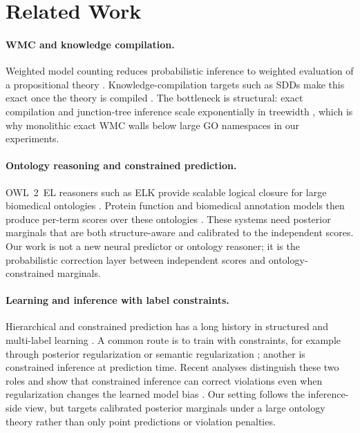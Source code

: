 \documentclass[letterpaper]{article}
\begin{document}
\section{Related Work}\label{sec:related}
\paragraph{WMC and knowledge compilation.}
Weighted model counting reduces probabilistic inference to weighted evaluation of a propositional theory \citep{chavira2008wmc}. Knowledge-compilation targets such as SDDs make this exact once the theory is compiled \citep{darwiche2002kcmap,darwiche2011sdd}. The bottleneck is structural: exact compilation and junction-tree inference scale exponentially in treewidth \citep{bodlaender1993treewidth}, which is why monolithic exact WMC walls below large GO namespaces in our experiments.

\paragraph{Ontology reasoning and constrained prediction.}
OWL~2~EL reasoners such as ELK provide scalable logical closure for large biomedical ontologies \citep{baader2005elenvelope,kazakov2014elk}. Protein function and biomedical annotation models then produce per-term scores over these ontologies \citep{kulmanov2018deepgo,kulmanov2020deepgoplus,kulmanov2022deepgozero,yu2023clean}. These systems need posterior marginals that are both structure-aware and calibrated to the independent scores. Our work is not a new neural predictor or ontology reasoner; it is the probabilistic correction layer between independent scores and ontology-constrained marginals.

\paragraph{Learning and inference with label constraints.}
Hierarchical and constrained prediction has a long history in structured and multi-label learning \citep{silla2011survey}. A common route is to train with constraints, for example through posterior regularization or semantic regularization \citep{ganchev2010posterior,diligenti2017semantic}; another is constrained inference at prediction time. Recent analyses distinguish these two roles and show that constrained inference can correct violations even when regularization changes the learned model bias \citep{wang2023regularization}. Our setting follows the inference-side view, but targets calibrated posterior marginals under a large ontology theory rather than only point predictions or violation penalties.
\end{document}
